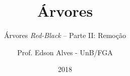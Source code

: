 \title{Árvores}
\subtitle{Árvores \textit{Red-Black} -- Parte II: Remoção}
\author{Prof. Edson Alves - UnB/FGA}
\date{2018}

